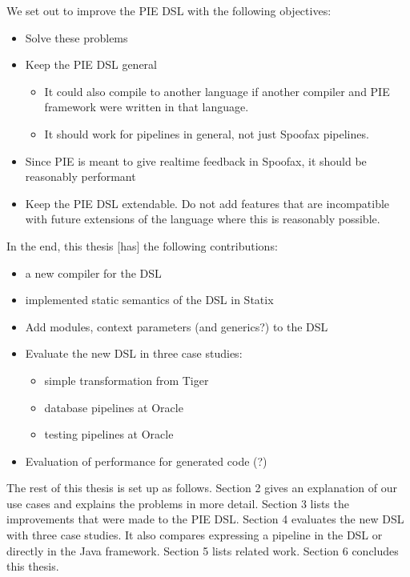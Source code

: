 We set out to improve the \ac{PIE} \ac{DSL} with the following objectives:
\begin{itemize}
  \item Solve these problems
  \item Keep the \ac{PIE} \ac{DSL} general
  \begin{itemize}
    \item It could also compile to another language if another compiler and \ac{PIE} framework were written in that language.
    \item It should work for pipelines in general, not just Spoofax pipelines.
  \end{itemize}
  \item Since \ac{PIE} is meant to give realtime feedback in Spoofax, it should be reasonably performant
  \item Keep the \ac{PIE} \ac{DSL} extendable. Do not add features that are incompatible with future extensions of the language where this is reasonably possible.
\end{itemize}

In the end, this thesis [has]  the following contributions:
\begin{itemize}
  \item a new compiler for the DSL
  \item implemented static semantics of the \ac{DSL} in Statix
  \item Add modules, context parameters (and generics?) to the DSL
  \item Evaluate the new \ac{DSL} in three case studies:
  \begin{itemize}
    \item simple transformation from Tiger
    \item database pipelines at Oracle
    \item testing pipelines at Oracle
  \end{itemize}
  \item Evaluation of performance for generated code (?)
\end{itemize}

The rest of this thesis is set up as follows.
Section 2 gives an explanation of our use cases and explains the problems in more detail.
Section 3 lists the improvements that were made to the \ac{PIE} \ac{DSL}.
Section 4 evaluates the new \ac{DSL} with three case studies.
It also compares expressing a pipeline in the \ac{DSL} or directly in the Java framework.
Section 5 lists related work. 
Section 6 concludes this thesis.
